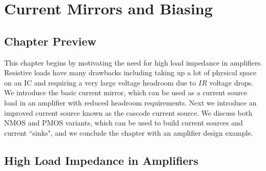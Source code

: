 \chapter{Current Mirrors and Biasing}
\label{ch:ch13_mirrors_biasing}
\graphicspath{{./figs_current_source/}}
\section{Chapter Preview}
This chapter begins by motivating the need for high load impedance in amplifiers.  Resistive loads have many drawbacks including taking up a lot of physical space on an IC and requiring a very large voltage headroom due to $IR$ voltage drops.  We introduce the basic current mirror, which can be used as a current source load in an amplifier with reduced headroom requirements.  Next we introduce an improved current source known as the cascode current source.  We discuss both NMOS and PMOS variants, which can be used to build current sources and current ``sinks", and we conclude the chapter with an amplifier design example.
\section{High Load Impedance in Amplifiers}
